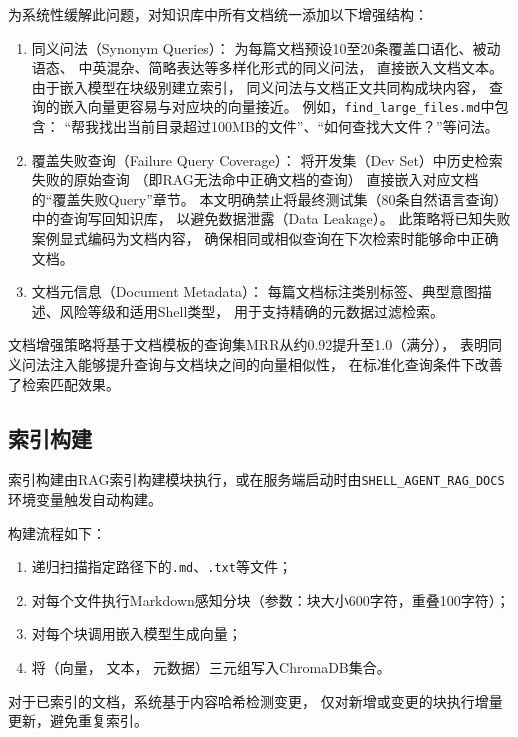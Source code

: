 为系统性缓解此问题，对知识库中所有文档统一添加以下增强结构：

\begin{enumerate}
    \item 同义问法（Synonym Queries）：
    为每篇文档预设10至20条覆盖口语化、被动语态、
    中英混杂、简略表达等多样化形式的同义问法，
    直接嵌入文档文本。
    由于嵌入模型在块级别建立索引，
    同义问法与文档正文共同构成块内容，
    查询的嵌入向量更容易与对应块的向量接近。
    例如，\texttt{find\_large\_files.md}中包含：
    “帮我找出当前目录超过100MB的文件”、“如何查找大文件？”等问法。

    \item 覆盖失败查询（Failure Query Coverage）：
    将开发集（Dev Set）中历史检索失败的原始查询
    （即RAG无法命中正确文档的查询）
    直接嵌入对应文档的“覆盖失败Query”章节。
    本文明确禁止将最终测试集（80条自然语言查询）中的查询写回知识库，
    以避免数据泄露（Data Leakage）。
    此策略将已知失败案例显式编码为文档内容，
    确保相同或相似查询在下次检索时能够命中正确文档。

    \item 文档元信息（Document Metadata）：
    每篇文档标注类别标签、典型意图描述、风险等级和适用Shell类型，
    用于支持精确的元数据过滤检索。
\end{enumerate}

文档增强策略将基于文档模板的查询集MRR从约0.92提升至1.0（满分），
表明同义问法注入能够提升查询与文档块之间的向量相似性，
在标准化查询条件下改善了检索匹配效果。

\subsection{索引构建}

\begin{sloppypar}
索引构建由RAG索引构建模块执行，或在服务端启动时由\texttt{SHELL\_AGENT\_RAG\_DOCS}环境变量触发自动构建。
\end{sloppypar}
构建流程如下：
\begin{enumerate}
    \item 递归扫描指定路径下的\texttt{.md}、\texttt{.txt}等文件；
    \item 对每个文件执行Markdown感知分块（参数：块大小600字符，重叠100字符）；
    \item 对每个块调用嵌入模型生成向量；
    \item 将（向量， 文本， 元数据）三元组写入ChromaDB集合。
\end{enumerate}
对于已索引的文档，系统基于内容哈希检测变更，
仅对新增或变更的块执行增量更新，避免重复索引。

